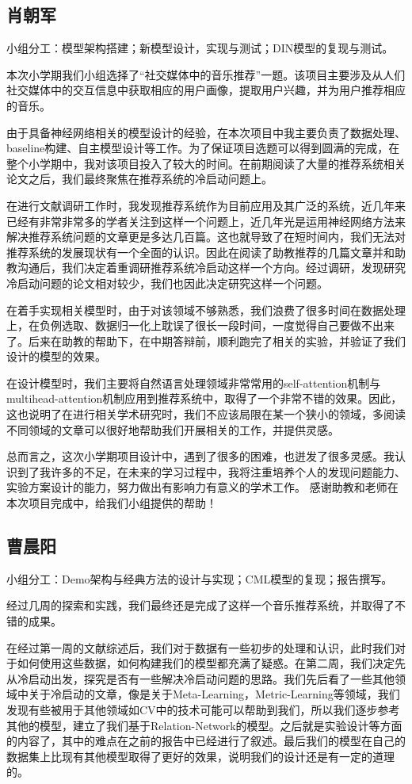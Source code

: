 \subsection{肖朝军}
小组分工：模型架构搭建；新模型设计，实现与测试；DIN模型的复现与测试。

本次小学期我们小组选择了“社交媒体中的音乐推荐”一题。该项目主要涉及从人们社交媒体中的交互信息中获取相应的用户画像，提取用户兴趣，并为用户推荐相应的音乐。

由于具备神经网络相关的模型设计的经验，在本次项目中我主要负责了数据处理、baseline构建、自主模型设计等工作。为了保证项目选题可以得到圆满的完成，在整个小学期中，我对该项目投入了较大的时间。在前期阅读了大量的推荐系统相关论文之后，我们最终聚焦在推荐系统的冷启动问题上。

在进行文献调研工作时，我发现推荐系统作为目前应用及其广泛的系统，近几年来已经有非常非常多的学者关注到这样一个问题上，近几年光是运用神经网络方法来解决推荐系统问题的文章更是多达几百篇。这也就导致了在短时间内，我们无法对推荐系统的发展现状有一个全面的认识。因此在阅读了助教推荐的几篇文章并和助教沟通后，我们决定着重调研推荐系统冷启动这样一个方向。经过调研，发现研究冷启动问题的论文相对较少，我们也因此决定研究这样一个问题。

在着手实现相关模型时，由于对该领域不够熟悉，我们浪费了很多时间在数据处理上，在负例选取、数据归一化上耽误了很长一段时间，一度觉得自己要做不出来了。后来在助教的帮助下，在中期答辩前，顺利跑完了相关的实验，并验证了我们设计的模型的效果。

在设计模型时，我们主要将自然语言处理领域非常常用的self-attention机制与multihead-attention机制应用到推荐系统中，取得了一个非常不错的效果。因此，这也说明了在进行相关学术研究时，我们不应该局限在某一个狭小的领域，多阅读不同领域的文章可以很好地帮助我们开展相关的工作，并提供灵感。

总而言之，这次小学期项目设计中，遇到了很多的困难，也迸发了很多灵感。我认识到了我许多的不足，在未来的学习过程中，我将注重培养个人的发现问题能力、实验方案设计的能力，努力做出有影响力有意义的学术工作。
感谢助教和老师在本次项目完成中，给我们小组提供的帮助！

\subsection{曹晨阳}
小组分工：Demo架构与经典方法的设计与实现；CML模型的复现；报告撰写。

经过几周的探索和实践，我们最终还是完成了这样一个音乐推荐系统，并取得了不错的成果。

在经过第一周的文献综述后，我们对于数据有一些初步的处理和认识，此时我们对于如何使用这些数据，如何构建我们的模型都充满了疑惑。在第二周，我们决定先从冷启动出发，探究是否有一些解决冷启动问题的思路。我们先后看了一些其他领域中关于冷启动的文章，像是关于Meta-Learning，Metric-Learning等领域，我们发现有些被用于其他领域如CV中的技术可能可以帮助到我们，所以我们逐步参考其他的模型，建立了我们基于Relation-Network的模型。之后就是实验设计等方面的内容了，其中的难点在之前的报告中已经进行了叙述。最后我们的模型在自己的数据集上比现有其他模型取得了更好的效果，说明我们的设计还是有一定的道理的。

